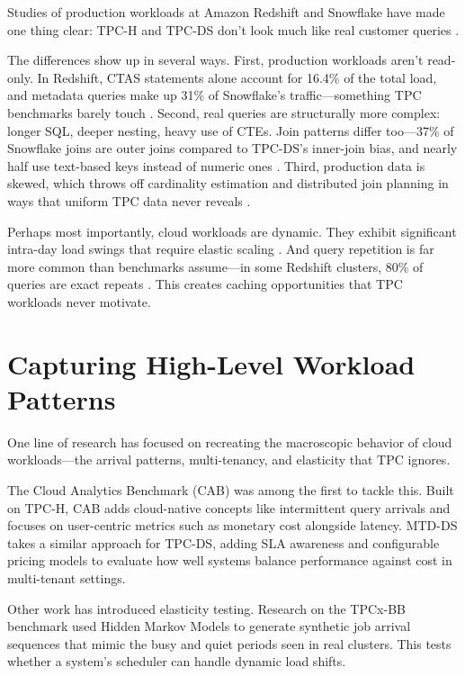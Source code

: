 \documentclass[12pt]{report}
\begin{document}
Studies of production workloads at Amazon Redshift and Snowflake have made one thing clear: TPC-H and TPC-DS don't look much like real customer queries \cite{redset, snowset}.

The differences show up in several ways. First, production workloads aren't read-only. In Redshift, CTAS statements alone account for 16.4\% of the total load, and metadata queries make up 31\% of Snowflake's traffic---something TPC benchmarks barely touch \cite{redset, snowset}. Second, real queries are structurally more complex: longer SQL, deeper nesting, heavy use of CTEs. Join patterns differ too---37\% of Snowflake joins are outer joins compared to TPC-DS's inner-join bias, and nearly half use text-based keys instead of numeric ones \cite{snowset}. Third, production data is skewed, which throws off cardinality estimation and distributed join planning in ways that uniform TPC data never reveals \cite{redset}.

Perhaps most importantly, cloud workloads are dynamic. They exhibit significant intra-day load swings that require elastic scaling \cite{cab, redset}. And query repetition is far more common than benchmarks assume---in some Redshift clusters, 80\% of queries are exact repeats \cite{redset}. This creates caching opportunities that TPC workloads never motivate.

\section{Capturing High-Level Workload Patterns}
\label{sec:high-level-patterns}

One line of research has focused on recreating the macroscopic behavior of cloud workloads---the arrival patterns, multi-tenancy, and elasticity that TPC ignores.

The Cloud Analytics Benchmark (CAB) \cite{cab} was among the first to tackle this. Built on TPC-H, CAB adds cloud-native concepts like intermittent query arrivals and focuses on user-centric metrics such as monetary cost alongside latency. MTD-DS \cite{mtdds} takes a similar approach for TPC-DS, adding SLA awareness and configurable pricing models to evaluate how well systems balance performance against cost in multi-tenant settings.

Other work has introduced elasticity testing. Research on the TPCx-BB benchmark \cite{elasticcloud} used Hidden Markov Models to generate synthetic job arrival sequences that mimic the busy and quiet periods seen in real clusters. This tests whether a system's scheduler can handle dynamic load shifts.
\end{document}
